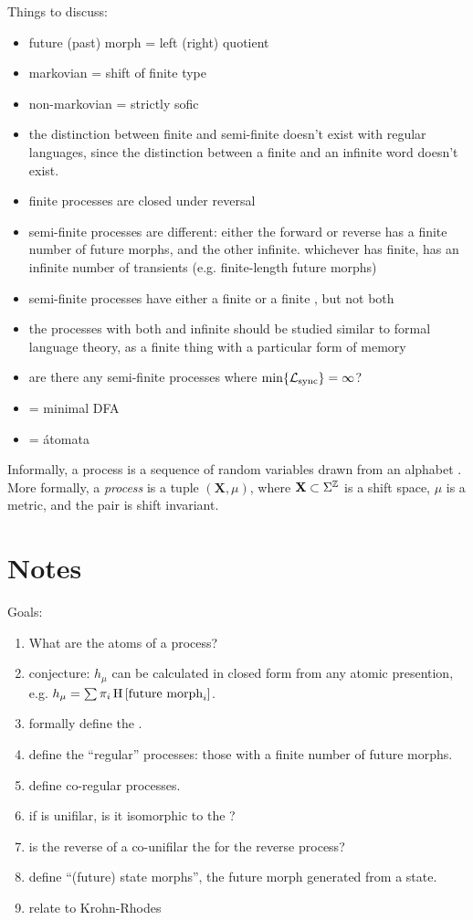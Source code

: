 \documentclass[prl,twocolumn,showpacs,superscriptaddress,preprintnumbers,floatfix]{revtex4-1}
\theoremstyle{plain}    \newtheorem{Lem}{Lemma}
\theoremstyle{plain}    \newtheorem*{ProLem}{Proof}
\theoremstyle{plain}    \newtheorem{Cor}{Corollary}
\theoremstyle{plain}    \newtheorem*{ProCor}{Proof}
\theoremstyle{plain}    \newtheorem{The}{Theorem}
\theoremstyle{plain}    \newtheorem*{ProThe}{Proof}
\theoremstyle{plain}    \newtheorem{Prop}{Proposition}
\theoremstyle{plain}    \newtheorem*{ProProp}{Proof}
\theoremstyle{plain}    \newtheorem*{Conj}{Conjecture}
\theoremstyle{plain}    \newtheorem*{Rem}{Remark}
\theoremstyle{plain}    \newtheorem{Def}{Definition}
\theoremstyle{plain}    \newtheorem*{Not}{Notation}
\begin{document}
Things to discuss:
\begin{itemize}
  \item future (past) morph = left (right) quotient
  \item markovian = shift of finite type
  \item non-markovian = strictly sofic
  \item the distinction between finite and semi-finite doesn't exist with
    regular languages, since the distinction between a finite and an infinite
    word doesn't exist.
  \item finite processes are closed under reversal
  \item semi-finite processes are different: either the forward or reverse has a
    finite number of future morphs, and the other infinite. whichever has
    finite, has an infinite number of transients (e.g. finite-length future morphs)
  \item semi-finite processes have either a finite \eM or a finite \eT, but not both
  \item the processes with both \eM and \eT infinite should be studied similar
    to formal language theory, as a finite thing with a particular form of
    memory
  \item are there any semi-finite processes where $\min\{\mathcal{L}_{\mathrm{sync}}\} = \infty$?
  \item \eM = minimal DFA
  \item \eT = \'{a}tomata
\end{itemize}

Informally, a process is a sequence of random variables drawn from an alphabet
\MeasAlphabet. More formally, a \emph{process} \Process is a tuple $(\mathbf{X},
\mu)$, where $\mathbf{X} \subset \Sigma^\mathbb{Z}$ is a shift space,
$\mu$ is a metric, and the pair is shift invariant.

\section{Notes}

Goals:
\begin{enumerate}
  \item What are the atoms of a process?
  \item conjecture: $h_\mu$ can be calculated in closed form from any atomic
    presention, e.g. $h_\mu = \sum \pi_i \operatorname{H}\left[\textrm{future morph}_i\right]$.
  \item formally define the \eT.
  \item define the ``regular'' processes: those with a finite number of future
    morphs.
  \item define co-regular processes.
  \item if \eT is unifilar, is it isomorphic to the \eM?
  \item is the reverse of a co-unifilar \eM the \eM for the reverse
    process?
  \item define ``(future) state morphs'', the future morph generated from a
    state.
  \item relate to Krohn-Rhodes
\end{enumerate}
\end{document}
